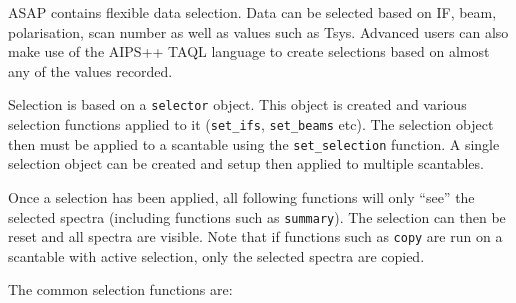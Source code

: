 \documentclass[11pt]{article}
\newcommand{\cmd}[1]{{\tt #1}}
\begin{document}
ASAP contains flexible data selection. Data can be selected based on
IF, beam, polarisation, scan number as well as values such as
Tsys. Advanced users can also make use of the AIPS++ TAQL language to
create selections based on almost any of the values recorded.

Selection is based on a \cmd{selector} object. This object is created
and various selection functions applied to it (\cmd{set\_ifs},
\cmd{set\_beams} etc). The selection object then must be applied to a
scantable using the \cmd{set\_selection} function. A single selection
object can be created and setup then applied to multiple scantables.

Once a selection has been applied, all following functions will only
``see'' the selected spectra (including functions such as
\cmd{summary}). The selection can then be reset and all spectra are
visible. Note that if functions such as \cmd{copy} are run on a
scantable with active selection, only the selected spectra are copied.

The common selection functions are:
\end{document}
